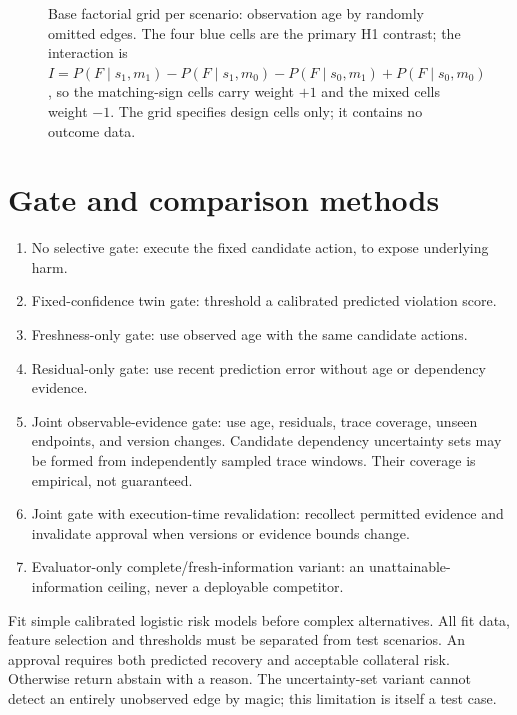﻿\documentclass[sigconf,nonacm]{acmart}
\begin{document}
\begin{figure}[t]
\begin{tikzpicture}[font=\fontsize{6.4pt}{7.8pt}\selectfont]
\end{tikzpicture}
\caption{Base factorial grid per scenario: observation age by randomly omitted edges. The four blue cells are the primary H1 contrast; the interaction is $I=P(F\mid s_1,m_1)-P(F\mid s_1,m_0)-P(F\mid s_0,m_1)+P(F\mid s_0,m_0)$, so the matching-sign cells carry weight $+1$ and the mixed cells weight $-1$. The grid specifies design cells only; it contains no outcome data.}
\label{fig:grid}
\end{figure}


\section{Gate and comparison methods}
\begin{enumerate}
\item No selective gate: execute the fixed candidate action, to expose underlying harm.
\item Fixed-confidence twin gate: threshold a calibrated predicted violation score.
\item Freshness-only gate: use observed age with the same candidate actions.
\item Residual-only gate: use recent prediction error without age or dependency evidence.
\item Joint observable-evidence gate: use age, residuals, trace coverage, unseen endpoints, and version changes. Candidate dependency uncertainty sets may be formed from independently sampled trace windows. Their coverage is empirical, not guaranteed.
\item Joint gate with execution-time revalidation: recollect permitted evidence and invalidate approval when versions or evidence bounds change.
\item Evaluator-only complete/fresh-information variant: an unattainable-information ceiling, never a deployable competitor.
\end{enumerate}

Fit simple calibrated logistic risk models before complex alternatives. All fit data, feature selection and thresholds must be separated from test scenarios. An approval requires both predicted recovery and acceptable collateral risk. Otherwise return abstain with a reason. The uncertainty-set variant cannot detect an entirely unobserved edge by magic; this limitation is itself a test case.
\end{document}
